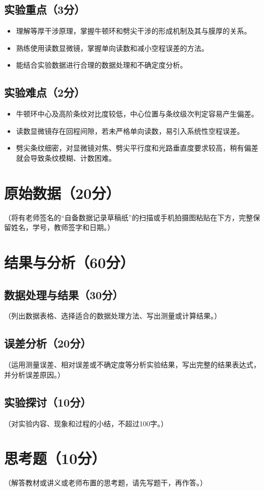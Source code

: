 \documentclass[yuxi]{../template/Report}%
\begin{document}
\subsection{实验重点（3分）}

\begin{itemize}
  \item 理解等厚干涉原理，掌握牛顿环和劈尖干涉的形成机制及其与膜厚的关系。
  \item 熟练使用读数显微镜，掌握单向读数和减小空程误差的方法。
  \item 能结合实验数据进行合理的数据处理和不确定度分析。
\end{itemize}

\subsection{实验难点（2分）}

\begin{itemize}
  \item 牛顿环中心及高阶条纹对比度较低，中心位置与条纹级次判定容易产生偏差。
  \item 读数显微镜存在回程间隙，若未严格单向读数，易引入系统性空程误差。
  \item 劈尖条纹细密，对显微镜对焦、劈尖平行度和光路垂直度要求较高，稍有偏差就会导致条纹模糊、计数困难。
\end{itemize}
\begin{fullreportonly}
\section{原始数据（20分）}
（将有老师签名的“自备数据记录草稿纸”的扫描或手机拍摄图粘贴在下方，完整保留姓名，学号，教师签字和日期。）

\section{结果与分析（60分）}
\subsection{数据处理与结果（30分）}
（列出数据表格、选择适合的数据处理方法、写出测量或计算结果。）

\subsection{误差分析（20分）}
（运用测量误差、相对误差或不确定度等分析实验结果，写出完整的结果表达式，并分析误差原因。）

\subsection{实验探讨（10分）}
（对实验内容、现象和过程的小结，不超过100字。）

\section{思考题（10分）}
（解答教材或讲义或老师布置的思考题，请先写题干，再作答。）
\end{fullreportonly}
\insertnotes
\end{document}
